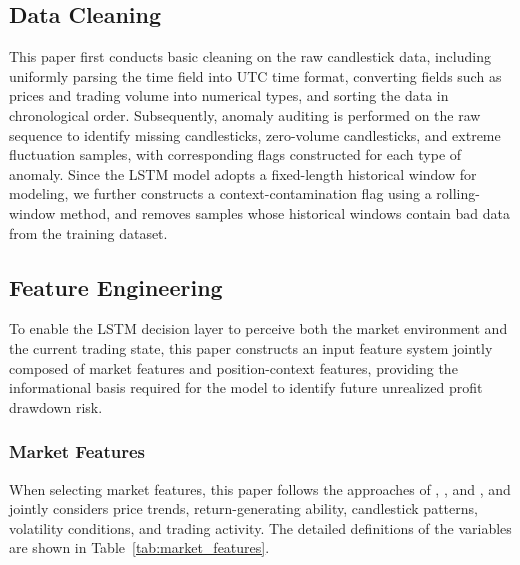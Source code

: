 \documentclass[12pt]{article}
\begin{document}
\subsection{Data Cleaning}

This paper first conducts basic cleaning on the raw candlestick data, including uniformly parsing the time field into UTC time format, converting fields such as prices and trading volume into numerical types, and sorting the data in chronological order. Subsequently, anomaly auditing is performed on the raw sequence to identify missing candlesticks, zero-volume candlesticks, and extreme fluctuation samples, with corresponding flags constructed for each type of anomaly. Since the LSTM model adopts a fixed-length historical window for modeling, we further constructs a context-contamination flag using a rolling-window method, and removes samples whose historical windows contain bad data from the training dataset.


\subsection{Feature Engineering}

To enable the LSTM decision layer to perceive both the market environment and the current trading state, this paper constructs an input feature system jointly composed of market features and position-context features, providing the informational basis required for the model to identify future unrealized profit drawdown risk.

\subsubsection{Market Features}

When selecting market features, this paper follows the approaches of \citet{FischerKrauss2018}, \citet{HuangWanZhangLu2024}, and \citet{AlKhatibEtAl2022}, and jointly considers price trends, return-generating ability, candlestick patterns, volatility conditions, and trading activity. The detailed definitions of the variables are shown in Table~\ref{tab:market_features}.
\end{document}
